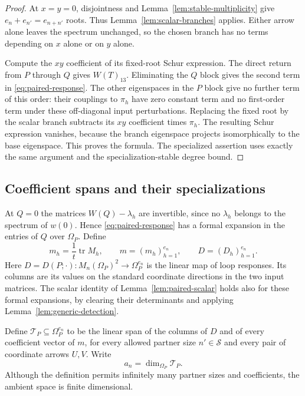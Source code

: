 \documentclass[11pt]{article}
\theoremstyle{definition}
\theoremstyle{remark}
\numberwithin{equation}{section}
\begin{document}
\begin{proof}
At $x=y=0$, disjointness and Lemma~\ref{lem:stable-multiplicity}
give $e_n+e_{n'}=e_{n+n'}$ roots.  Thus
Lemma~\ref{lem:scalar-branches} applies.  Either arrow alone leaves
the spectrum unchanged, so the chosen branch has no terms depending
on $x$ alone or on $y$ alone.

Compute the $xy$ coefficient of its fixed-root Schur expression.
The direct return from $P$ through $Q$ gives $W(T)_{13}$.  Eliminating
the $Q$ block gives the second term in
\eqref{eq:paired-response}.  The other eigenspaces in the $P$ block
give no further term of this order: their couplings to $\pi_h$ have
zero constant term and no first-order term under these off-diagonal
input perturbations.  Replacing the fixed root by the scalar branch
subtracts its $xy$ coefficient times $\pi_h$.  The resulting Schur
expression vanishes, because the branch eigenspace projects
isomorphically to the base eigenspace.  This proves the formula.
The specialized assertion uses exactly the same argument and the
specialization-stable degree bound.
\end{proof}

\subsection{Coefficient spans and their specializations}
\label{subsec:active-space}

At $Q=0$ the matrices $W(Q)-\lambda_h$ are invertible, since no
$\lambda_h$ belongs to the spectrum of $w(0)$.  Hence
\eqref{eq:paired-response} has a formal expansion in the entries of
$Q$ over $\Omega_P$.  Define
\[
 m_h=\frac1t\operatorname{tr}M_h,
 \qquad m=(m_h)_{h=1}^{e_n},\qquad D=(D_h)_{h=1}^{e_n}.
\]
Here $D=D(P;\cdot):M_n(\Omega_P)^2\to\Omega_P^{e_n}$ is the linear
map of loop responses. Its columns are its values on the standard
coordinate directions in the two input matrices.
The scalar identity of Lemma~\ref{lem:paired-scalar} holds also for
these formal expansions, by clearing their determinants and applying
Lemma~\ref{lem:generic-detection}.

Define $\mathcal T_P\subseteq\Omega_P^{e_n}$ to be the linear span
of the columns of $D$ and of every coefficient vector of $m$, for
every allowed partner size $n'\in\mathcal S$ and every pair of
coordinate arrows $U,V$.  Write
\[
 a_n=\dim_{\Omega_P}\mathcal T_P.
\]
Although the definition permits infinitely many partner sizes and
coefficients, the ambient space is finite dimensional.
\end{document}
